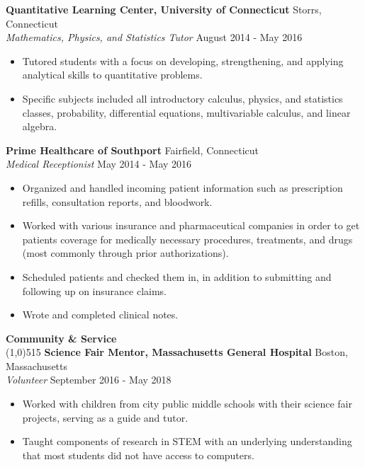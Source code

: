 \documentclass{article}
\newcommand{\s}[1]{\vspace{4mm} \noindent \large \textbf{#1} \\[-2.5mm] \linethickness{0.2mm} \line(1,0){515}}
\newcommand{\n}{\\ \noindent \normalsize}
\newcommand{\nl}{\noindent \normalsize}
\begin{document}
	\nl \textbf{Quantitative Learning Center, University of Connecticut} \hfill Storrs, Connecticut
	\n \textit{Mathematics, Physics, and Statistics Tutor} \hfill August 2014 - May 2016
	\begin{itemize}
		\item Tutored students with a focus on developing, strengthening, and applying analytical skills to quantitative problems.
		\vspace{-2.5mm} \item Specific subjects included all introductory calculus, physics, and statistics classes, probability, differential equations, multivariable calculus, and linear algebra. 
	\end{itemize}			
	
	\nl \textbf{Prime Healthcare of Southport} \hfill Fairfield, Connecticut
	\n \textit{Medical Receptionist} \hfill May 2014 - May 2016
	\begin{itemize}
		\item Organized and handled incoming patient information such as prescription refills, consultation reports, and bloodwork.
		\vspace{-2.5mm} \item Worked with various insurance and pharmaceutical companies in order to get patients coverage for medically necessary procedures, treatments, and drugs (most commonly through prior authorizations).
		\vspace{-2.5mm} \item Scheduled patients and checked them in, in addition to submitting and following up on insurance claims. 
		\vspace{-2.5mm} \item  Wrote and completed clinical notes.
	\end{itemize}

	\vspace{-3.5mm}	

\s{Community \& Service}
	\vspace{2.0mm}
	\nl \textbf{Science Fair Mentor, Massachusetts General Hospital} \hfill Boston, Massachusetts
	\n \textit{Volunteer} \hfill September 2016 - May 2018
		\begin{itemize}
			\item Worked with children from city public middle schools with their science fair projects, serving as a guide and tutor. 
			\vspace{-2.5mm} \item Taught components of research in STEM with an underlying understanding that most students did not have access to computers. 
		\end{itemize}
		
\end{document}
